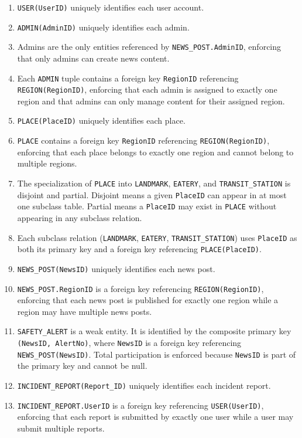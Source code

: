 \begin{enumerate}
    \item \texttt{USER(UserID)} uniquely identifies each user account.
    \item \texttt{ADMIN(AdminID)} uniquely identifies each admin.
    \item Admins are the only entities referenced by \texttt{NEWS\_POST.AdminID}, enforcing that only admins can create news content.
    \item Each \texttt{ADMIN} tuple contains a foreign key \texttt{RegionID} referencing \texttt{REGION(RegionID)}, enforcing that each admin is assigned to exactly one region and that admins can only manage content for their assigned region.
    \item \texttt{PLACE(PlaceID)} uniquely identifies each place.
    \item \texttt{PLACE} contains a foreign key \texttt{RegionID} referencing \texttt{REGION(RegionID)}, enforcing that each place belongs to exactly one region and cannot belong to multiple regions.
    \item The specialization of \texttt{PLACE} into \texttt{LANDMARK}, \texttt{EATERY}, and \texttt{TRANSIT\_STATION} is disjoint and partial. Disjoint means a given \texttt{PlaceID} can appear in at most one subclass table. Partial means a \texttt{PlaceID} may exist in \texttt{PLACE} without appearing in any subclass relation.
    \item Each subclass relation (\texttt{LANDMARK}, \texttt{EATERY}, \texttt{TRANSIT\_STATION}) uses \texttt{PlaceID} as both its primary key and a foreign key referencing \texttt{PLACE(PlaceID)}.
    \item \texttt{NEWS\_POST(NewsID)} uniquely identifies each news post.
    \item \texttt{NEWS\_POST.RegionID} is a foreign key referencing \texttt{REGION(RegionID)}, enforcing that each news post is published for exactly one region while a region may have multiple news posts.
    \item \texttt{SAFETY\_ALERT} is a weak entity. It is identified by the composite primary key \texttt{(NewsID, AlertNo)}, where \texttt{NewsID} is a foreign key referencing \texttt{NEWS\_POST(NewsID)}. Total participation is enforced because \texttt{NewsID} is part of the primary key and cannot be null.
    \item \texttt{INCIDENT\_REPORT(Report\_ID)} uniquely identifies each incident report.
    \item \texttt{INCIDENT\_REPORT.UserID} is a foreign key referencing \texttt{USER(UserID)}, enforcing that each report is submitted by exactly one user while a user may submit multiple reports.

\end{enumerate}
